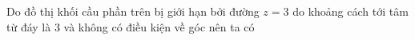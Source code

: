 \documentclass[preview]{standalone}
\begin{document}
\begin{center}
Do đồ thị khối cầu phần trên bị giới hạn bởi đường $z=3$ do khoảng cách tới tâm từ đáy là 3 và không có điều kiện về góc nên ta có
\end{center}
\end{document}
